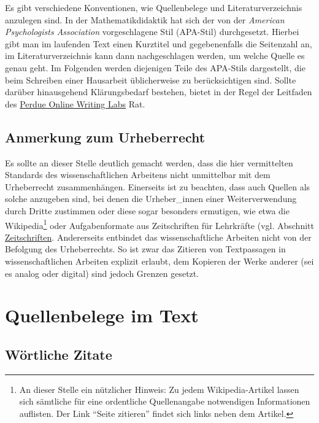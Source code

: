 \documentclass[ngerman,bibliography=totoc,oneside,12pt,a4paper]{scrbook}
\begin{document}
Es gibt verschiedene Konventionen, wie Quellenbelege und
Literaturverzeichnis anzulegen sind. In der Mathematikdidaktik hat sich
der von der \emph{American Psychologists Association} vorgeschlagene
Stil (APA-Stil) durchgesetzt. Hierbei gibt man im laufenden Text einen
Kurztitel und gegebenenfalls die Seitenzahl an, im Literaturverzeichnis
kann dann nachgeschlagen werden, um welche Quelle es genau geht. Im
Folgenden werden diejenigen Teile des APA-Stils dargestellt, die beim
Schreiben einer Hausarbeit üblicherweise zu berücksichtigen sind. Sollte
darüber hinausgehend Klärungsbedarf bestehen, bietet in der Regel der
Leitfaden des
\href{http://owl.english.purdue.edu/owl/section/2/10/}{Perdue Online
Writing Labs} Rat.

\subsection*{Anmerkung zum
Urheberrecht}\label{anmerkung-zum-urheberrecht}

Es sollte an dieser Stelle deutlich gemacht werden, dass die hier
vermittelten Standards des wissenschaftlichen Arbeitens nicht
unmittelbar mit dem Urheberrecht zusammenhängen. Einerseits ist zu
beachten, dass auch Quellen als solche anzugeben sind, bei denen die
Urheber\_innen einer Weiterverwendung durch Dritte zustimmen oder diese
sogar besonders ermutigen, wie etwa die Wikipedia\footnote{An dieser
  Stelle ein nützlicher Hinweis: Zu jedem Wikipedia-Artikel lassen sich
  sämtliche für eine ordentliche Quellenangabe notwendigen Informationen
  auflisten. Der Link \enquote{Seite zitieren} findet sich links neben
  dem Artikel.} oder Aufgabenformate aus Zeitschriften für Lehrkräfte
(vgl. Abschnitt \protect\hyperlink{zeitschriften}{Zeitschriften}.
Andererseits entbindet das wissenschaftliche Arbeiten nicht von der
Befolgung des Urheberrechts. So ist zwar das Zitieren von Textpassagen
in wissenschaftlichen Arbeiten explizit erlaubt, dem Kopieren der Werke
anderer (sei es analog oder digital) sind jedoch Grenzen gesetzt.

\section{Quellenbelege im Text}\label{quellenbelege-im-text}

\subsection{Wörtliche Zitate}\label{wortliche-zitate}
\end{document}

